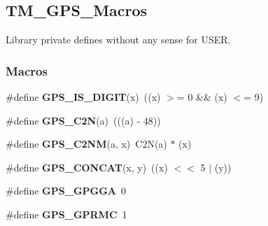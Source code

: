 \hypertarget{group___t_m___g_p_s___macros}{}\subsection{T\+M\+\_\+\+G\+P\+S\+\_\+\+Macros}
\label{group___t_m___g_p_s___macros}


Library private defines without any sense for U\+S\+E\+R.  


\subsubsection*{Macros}
\begin{DoxyCompactItemize}
\item 
\hypertarget{group___t_m___g_p_s___macros_ga3549cf40f9b02ef2311757b87a742a48}{}\#define {\bfseries G\+P\+S\+\_\+\+I\+S\+\_\+\+D\+I\+G\+I\+T}(x)~((x) $>$= \textquotesingle{}0\textquotesingle{} \&\& (x) $<$= \textquotesingle{}9\textquotesingle{})\label{group___t_m___g_p_s___macros_ga3549cf40f9b02ef2311757b87a742a48}

\item 
\hypertarget{group___t_m___g_p_s___macros_ga479301dab3f213c47ee51af3188957b2}{}\#define {\bfseries G\+P\+S\+\_\+\+C2\+N}(a)~(((a) -\/ 48))\label{group___t_m___g_p_s___macros_ga479301dab3f213c47ee51af3188957b2}

\item 
\hypertarget{group___t_m___g_p_s___macros_ga6b8c0a2bccde3d6a853e53ecf895506e}{}\#define {\bfseries G\+P\+S\+\_\+\+C2\+N\+M}(a,  x)~C2\+N(a) $\ast$ (x)\label{group___t_m___g_p_s___macros_ga6b8c0a2bccde3d6a853e53ecf895506e}

\item 
\hypertarget{group___t_m___g_p_s___macros_ga5debc0fb8a688ce5d2e3d4df08db39d6}{}\#define {\bfseries G\+P\+S\+\_\+\+C\+O\+N\+C\+A\+T}(x,  y)~((x) $<$$<$ 5 $\vert$ (y))\label{group___t_m___g_p_s___macros_ga5debc0fb8a688ce5d2e3d4df08db39d6}

\item 
\hypertarget{group___t_m___g_p_s___macros_gad5dbcbcc4248b8bd114546c29cef8ce3}{}\#define {\bfseries G\+P\+S\+\_\+\+G\+P\+G\+G\+A}~0\label{group___t_m___g_p_s___macros_gad5dbcbcc4248b8bd114546c29cef8ce3}

\item 
\hypertarget{group___t_m___g_p_s___macros_ga89f6894d41f315f56560ecd5802ac078}{}\#define {\bfseries G\+P\+S\+\_\+\+G\+P\+R\+M\+C}~1\label{group___t_m___g_p_s___macros_ga89f6894d41f315f56560ecd5802ac078}


\end{DoxyCompactItemize}
